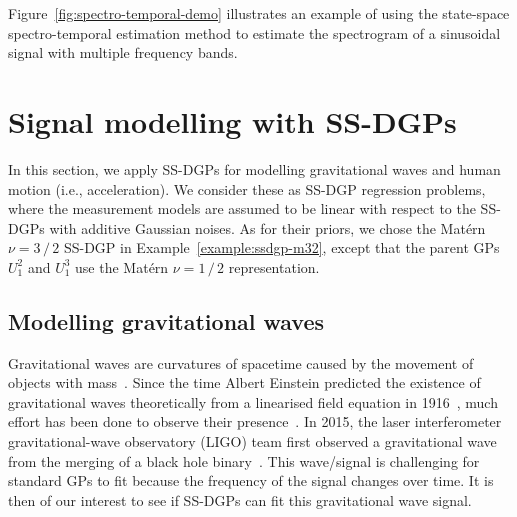 Figure~\ref{fig:spectro-temporal-demo} illustrates an example of using the state-space spectro-temporal estimation method to estimate the spectrogram of a sinusoidal signal with multiple frequency bands. 

\section{Signal modelling with SS-DGPs}
\label{sec:apps-ssdgp}
In this section, we apply SS-DGPs for modelling gravitational waves and human motion (i.e., acceleration). We consider these as SS-DGP regression problems, where the measurement models are assumed to be linear with respect to the SS-DGPs with additive Gaussian noises. As for their priors, we chose the Mat\'{e}rn $\nu=3 \, / \, 2$ SS-DGP in Example~\ref{example:ssdgp-m32}, except that the parent GPs $U^2_1$ and $U^3_1$ use the Mat\'{e}rn $\nu=1 \, / \, 2$ representation.

\subsection*{Modelling gravitational waves}
Gravitational waves are curvatures of spacetime caused by the movement of objects with mass~\citep{Maggiore2008}. Since the time Albert Einstein predicted the existence of gravitational waves theoretically from a linearised field equation in 1916~\citep{EinsteinGW1937, Hill2017}, much effort has been done to observe their presence~\citep{Blair1991}. In 2015, the laser interferometer gravitational-wave observatory (LIGO) team first observed a gravitational wave from the merging of a black hole binary~\citep[event GW150914,][]{LIGO2016}. This wave/signal is challenging for standard GPs to fit because the frequency of the signal changes over time. It is then of our interest to see if SS-DGPs can fit this gravitational wave signal.

